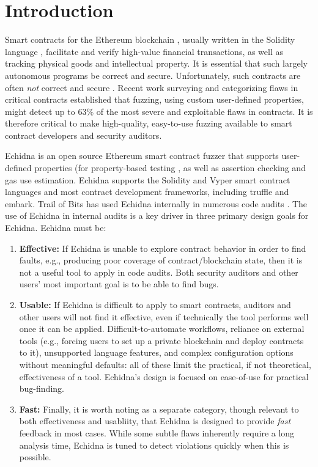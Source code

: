 \section{Introduction}

Smart contracts for the Ethereum blockchain \cite{buterin2013whitepaper}, usually written in the Solidity language \cite{wood2014yellow}, facilitate and verify high-value financial transactions, as well as tracking physical goods and intellectual property.  It is essential that such largely autonomous programs be correct and secure.  Unfortunately, such contracts are often \emph{not} correct and secure \cite{SurveyAttacks}.  Recent work surveying and categorizing flaws in critical contracts \cite{FC20} established that fuzzing, using custom user-defined properties, might detect up to 63\% of the most severe and exploitable flaws in contracts.  It is therefore critical to make high-quality, easy-to-use fuzzing available to smart contract developers and security auditors.

Echidna \cite{echidna-code} is an open source Ethereum smart contract fuzzer that supports user-defined properties (for property-based testing \cite{ClaessenH00}, as well as assertion checking and gas use estimation.  Echidna supports the Solidity and Vyper smart contract languages and most contract development frameworks, including truffle and embark. Trail of Bits has used Echidna internally in numerous code audits \cite{FC20,reports}.
The use of Echidna in internal audits is a key driver in three primary design goals for Echidna. Echidna must be:

\begin{enumerate}
\item {\bf Effective:}  If Echidna is unable to explore contract behavior in order to find faults, e.g., producing poor coverage of contract/blockchain state, then it is not a useful tool to apply in code audits.  Both security auditors and other users' most important goal is to be able to find bugs.
\item {\bf Usable:} If Echidna is difficult to apply to smart contracts, auditors and other users will not find it effective, even if technically the tool performs well once it can be applied.  Difficult-to-automate workflows, reliance on external tools (e.g., forcing users to set up a private blockchain and deploy contracts to it), unsupported language features, and complex configuration options without meaningful defaults: all of these limit the practical, if not theoretical, effectiveness of a tool.  Echidna's design is focused on ease-of-use for practical bug-finding.
\item {\bf Fast:}  Finally, it is worth noting as a separate category, though relevant to both effectiveness and usabliity, that Echidna is designed to provide \emph{fast} feedback in most cases.  While some subtle flaws inherently require a long analysis time, Echidna is tuned to detect violations quickly when this is possible.  
\end{enumerate}

